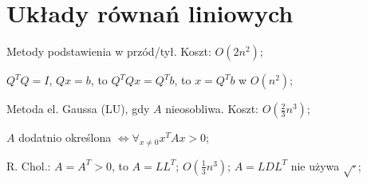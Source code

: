 \section{Układy równań liniowych}

\entry
Metody podstawienia w przód/tył. Koszt: $O(2n^2)$;

\entry
$Q^TQ=I$, $Qx=b$, to $Q^TQx=Q^Tb$, to $x=Q^Tb$ w $O(n^2)$;



\entry
Metoda el. Gaussa (LU), gdy $A$ nieosobliwa. Koszt: $O(\frac{2}{3}n^3)$;

\entry
$A$ dodatnio określona $\iff \forall_{x \neq 0} x^TAx>0$;

\entry
R. Chol.:
$A=A^T>0$,
to
$A=LL^T$;
$O(\frac{1}{3}n^3)$;
$A=LDL^T$
nie używa
$\sqrt{\cdot}$;

